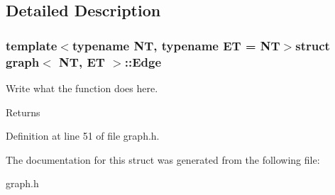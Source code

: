 \subsection{Detailed Description}
\subsubsection*{template$<$typename N\+T, typename E\+T = N\+T$>$struct graph$<$ N\+T, E\+T $>$\+::\+Edge}

Write what the function does here. 

\begin{DoxyReturn}{Returns}

\end{DoxyReturn}


Definition at line 51 of file graph.\+h.



The documentation for this struct was generated from the following file\+:\begin{DoxyCompactItemize}
\item 
graph.\+h\end{DoxyCompactItemize}
